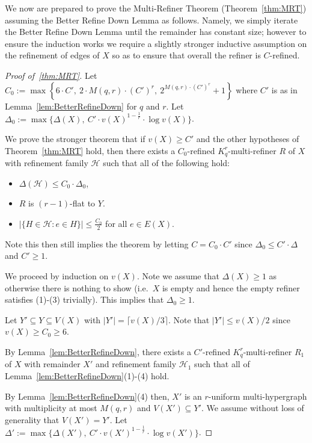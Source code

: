 \documentclass[11pt]{article}
\newcounter{i}
\theoremstyle{plain}
\renewcommand{\theclaim}{\thetheorem.\arabic{claim}}
\newenvironment{lateproof}[1]
 {%
  \renewcommand{\theclaim}{\ref{#1}.\arabic{claim}}%
  \begin{proof}[Proof of~\cref{#1}]%
 }
 {\end{proof}}
\theoremstyle{plain} %
\theoremstyle{definition}
\begin{document}
We now are prepared to prove the Multi-Refiner Theorem (Theorem~\ref{thm:MRT}) assuming the Better Refine Down Lemma as follows. Namely, we simply iterate the Better Refine Down Lemma until the remainder has constant size; however to ensure the induction works we require a slightly stronger inductive assumption on the refinement of edges of $X$ so as to ensure that overall the refiner is $C$-refined.

\begin{lateproof}{thm:MRT}
Let $C_0:=\max\left\{6\cdot C',~2\cdot M(q,r)\cdot (C')^{r},~2^{M(q,r)\cdot (C')^{r}} + 1\right\}$ where $C'$ is as in Lemma~\ref{lem:BetterRefineDown} for $q$ and $r$. Let $\Delta_0 := \max \{\Delta(X),~C'\cdot v(X)^{1-\frac{1}{r}}\cdot \log v(X)\}$.

We prove the stronger theorem that if $v(X)\ge C'$ and the other hypotheses of Theorem~\ref{thm:MRT} hold, then there exists a $C_0$-refined $K_q^r$-multi-refiner $R$ of $X$ with refinement family $\mathcal{H}$ such that all of the following hold:
\begin{itemize}
    \item[(1)] $\Delta(\mathcal{H})\le C_0\cdot \Delta_0$,
    \item[(2)] $R$ is $(r-1)$-flat to $Y$.
    \item[(3)] $|\{H\in \mathcal{H}: e\in H\}|\le \frac{C_0}{2}$ for all $e\in E(X)$.
\end{itemize}
Note this then still implies the theorem by letting $C=C_0\cdot C'$ since $\Delta_0\le C'\cdot \Delta$ and $C'\ge 1$.

We proceed by induction on $v(X)$. Note we assume that $\Delta(X)\ge 1$ as otherwise there is nothing to show (i.e.~$X$ is empty and hence the empty refiner satisfies (1)-(3) trivially). This implies that $\Delta_0\ge 1$.

Let $Y' \subseteq Y \subseteq V(X)$ with $|Y'| = \lceil v(X)/3 \rceil$. Note that $|Y'|\le v(X)/2$ since $v(X)\ge C_0 \ge 6$. 

By Lemma~\ref{lem:BetterRefineDown}, there exists a $C'$-refined $K_q^r$-multi-refiner $R_1$ of $X$ with remainder $X'$ and refinement family $\mathcal{H}_1$ such that all of Lemma~\ref{lem:BetterRefineDown}(1)-(4) hold.

By Lemma~\ref{lem:BetterRefineDown}(4) then, $X'$ is an $r$-uniform multi-hypergraph with multiplicity at most $M(q,r)$  and $V(X') \subseteq Y'$. We assume without loss of generality that $V(X')=Y'$. Let $\Delta':= \max\{\Delta(X'),~C'\cdot v(X')^{1-\frac{1}{r}}\cdot \log v(X')\}$. 


\end{lateproof}
\end{document}
